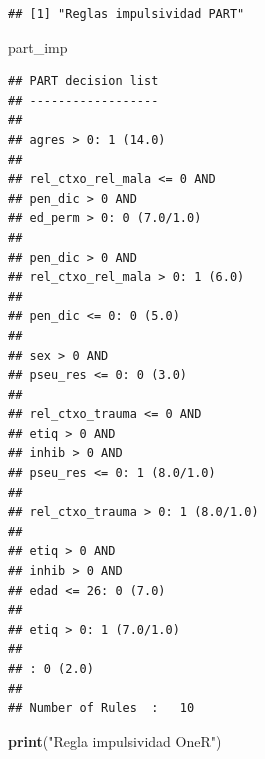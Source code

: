 \documentclass[]{article}
\newenvironment{Shaded}{\begin{snugshade}}{\end{snugshade}}
\newcommand{\KeywordTok}[1]{\textcolor[rgb]{0.13,0.29,0.53}{\textbf{#1}}}
\newcommand{\DataTypeTok}[1]{\textcolor[rgb]{0.13,0.29,0.53}{#1}}
\newcommand{\StringTok}[1]{\textcolor[rgb]{0.31,0.60,0.02}{#1}}
\newcommand{\CommentTok}[1]{\textcolor[rgb]{0.56,0.35,0.01}{\textit{#1}}}
\newcommand{\OperatorTok}[1]{\textcolor[rgb]{0.81,0.36,0.00}{\textbf{#1}}}
\newcommand{\NormalTok}[1]{#1}
\begin{document}
\begin{Shaded}
\end{Shaded}

\begin{verbatim}
## [1] "Reglas impulsividad PART"
\end{verbatim}

\begin{Shaded}
\begin{Highlighting}[]
\NormalTok{part_imp}
\end{Highlighting}
\end{Shaded}

\begin{verbatim}
## PART decision list
## ------------------
## 
## agres > 0: 1 (14.0)
## 
## rel_ctxo_rel_mala <= 0 AND
## pen_dic > 0 AND
## ed_perm > 0: 0 (7.0/1.0)
## 
## pen_dic > 0 AND
## rel_ctxo_rel_mala > 0: 1 (6.0)
## 
## pen_dic <= 0: 0 (5.0)
## 
## sex > 0 AND
## pseu_res <= 0: 0 (3.0)
## 
## rel_ctxo_trauma <= 0 AND
## etiq > 0 AND
## inhib > 0 AND
## pseu_res <= 0: 1 (8.0/1.0)
## 
## rel_ctxo_trauma > 0: 1 (8.0/1.0)
## 
## etiq > 0 AND
## inhib > 0 AND
## edad <= 26: 0 (7.0)
## 
## etiq > 0: 1 (7.0/1.0)
## 
## : 0 (2.0)
## 
## Number of Rules  :   10
\end{verbatim}

\begin{Shaded}
\begin{Highlighting}[]
\KeywordTok{print}\NormalTok{(}\StringTok{"Regla impulsividad OneR"}\NormalTok{)}
\end{Highlighting}
\end{Shaded}
\end{document}
